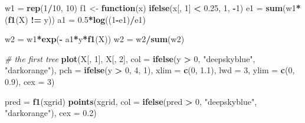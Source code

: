 \documentclass[
]{book}
\newenvironment{Shaded}{\begin{snugshade}}{\end{snugshade}}
\newcommand{\AttributeTok}[1]{\textcolor[rgb]{0.13,0.29,0.53}{#1}}
\newcommand{\CommentTok}[1]{\textcolor[rgb]{0.56,0.35,0.01}{\textit{#1}}}
\newcommand{\ControlFlowTok}[1]{\textcolor[rgb]{0.13,0.29,0.53}{\textbf{#1}}}
\newcommand{\DecValTok}[1]{\textcolor[rgb]{0.00,0.00,0.81}{#1}}
\newcommand{\FloatTok}[1]{\textcolor[rgb]{0.00,0.00,0.81}{#1}}
\newcommand{\FunctionTok}[1]{\textcolor[rgb]{0.13,0.29,0.53}{\textbf{#1}}}
\newcommand{\NormalTok}[1]{#1}
\newcommand{\OtherTok}[1]{\textcolor[rgb]{0.56,0.35,0.01}{#1}}
\newcommand{\SpecialCharTok}[1]{\textcolor[rgb]{0.81,0.36,0.00}{\textbf{#1}}}
\newcommand{\StringTok}[1]{\textcolor[rgb]{0.31,0.60,0.02}{#1}}
\theoremstyle{definition}
\theoremstyle{definition}
\theoremstyle{definition}
\theoremstyle{definition}
\theoremstyle{remark}
\begin{document}
\begin{Shaded}
\begin{Highlighting}[]
\NormalTok{  w1 }\OtherTok{=} \FunctionTok{rep}\NormalTok{(}\DecValTok{1}\SpecialCharTok{/}\DecValTok{10}\NormalTok{, }\DecValTok{10}\NormalTok{)}
\NormalTok{  f1 }\OtherTok{\textless{}{-}} \ControlFlowTok{function}\NormalTok{(x) }\FunctionTok{ifelse}\NormalTok{(x[, }\DecValTok{1}\NormalTok{] }\SpecialCharTok{\textless{}} \FloatTok{0.25}\NormalTok{, }\DecValTok{1}\NormalTok{, }\SpecialCharTok{{-}}\DecValTok{1}\NormalTok{)}
\NormalTok{  e1 }\OtherTok{=} \FunctionTok{sum}\NormalTok{(w1}\SpecialCharTok{*}\NormalTok{(}\FunctionTok{f1}\NormalTok{(X) }\SpecialCharTok{!=}\NormalTok{ y))}
\NormalTok{  a1 }\OtherTok{=} \FloatTok{0.5}\SpecialCharTok{*}\FunctionTok{log}\NormalTok{((}\DecValTok{1}\SpecialCharTok{{-}}\NormalTok{e1)}\SpecialCharTok{/}\NormalTok{e1)}
  
\NormalTok{  w2 }\OtherTok{=}\NormalTok{ w1}\SpecialCharTok{*}\FunctionTok{exp}\NormalTok{(}\SpecialCharTok{{-}}\NormalTok{ a1}\SpecialCharTok{*}\NormalTok{y}\SpecialCharTok{*}\FunctionTok{f1}\NormalTok{(X))}
\NormalTok{  w2 }\OtherTok{=}\NormalTok{ w2}\SpecialCharTok{/}\FunctionTok{sum}\NormalTok{(w2)}
  
  \CommentTok{\# the first tree}
  \FunctionTok{plot}\NormalTok{(X[, }\DecValTok{1}\NormalTok{], X[, }\DecValTok{2}\NormalTok{], }\AttributeTok{col =} \FunctionTok{ifelse}\NormalTok{(y }\SpecialCharTok{\textgreater{}} \DecValTok{0}\NormalTok{, }\StringTok{"deepskyblue"}\NormalTok{, }\StringTok{"darkorange"}\NormalTok{),}
       \AttributeTok{pch =} \FunctionTok{ifelse}\NormalTok{(y }\SpecialCharTok{\textgreater{}} \DecValTok{0}\NormalTok{, }\DecValTok{4}\NormalTok{, }\DecValTok{1}\NormalTok{), }\AttributeTok{xlim =} \FunctionTok{c}\NormalTok{(}\DecValTok{0}\NormalTok{, }\FloatTok{1.1}\NormalTok{), }\AttributeTok{lwd =} \DecValTok{3}\NormalTok{,}
       \AttributeTok{ylim =} \FunctionTok{c}\NormalTok{(}\DecValTok{0}\NormalTok{, }\FloatTok{0.9}\NormalTok{), }\AttributeTok{cex =} \DecValTok{3}\NormalTok{)}
  
\NormalTok{  pred }\OtherTok{=} \FunctionTok{f1}\NormalTok{(xgrid)}
  \FunctionTok{points}\NormalTok{(xgrid, }\AttributeTok{col =} \FunctionTok{ifelse}\NormalTok{(pred }\SpecialCharTok{\textgreater{}} \DecValTok{0}\NormalTok{, }\StringTok{"deepskyblue"}\NormalTok{, }\StringTok{"darkorange"}\NormalTok{), }
         \AttributeTok{cex =} \FloatTok{0.2}\NormalTok{)}
  

\end{Highlighting}
\end{Shaded}
\end{document}
